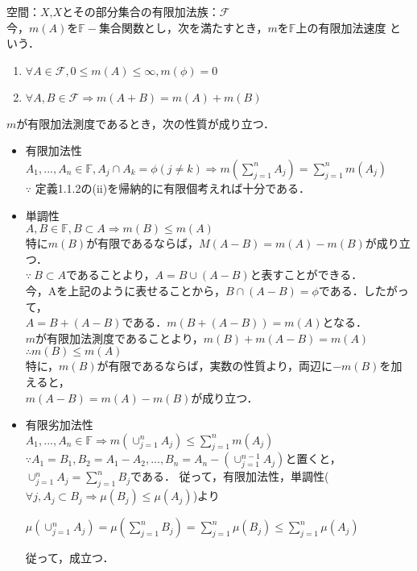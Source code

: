 \documentclass[11pt, a4paper, dvipdfmx]{jsarticle}
\theoremstyle{definition}
\newcommand{\F}{\mathcal{F}}
\begin{document}
\Definition 空間：$X$,$X$とその部分集合の有限加法族：$\F$\\
今，$m(A)$を$\mathbb{F}-$集合関数とし，次を満たすとき，$m$を$\mathbb{F}$上の有限加法速度
という．\\
\begin{enumerate}
\renewcommand{\labelenumi}{(\roman{enumi})}
\item $\forall A \in \F,0 \le m(A) \le \infty,m(\phi)=0$
\item $\forall A,B \in \F \Rightarrow m(A+B) = m(A)+m(B)$
\end{enumerate}
$m$が有限加法測度であるとき，次の性質が成り立つ．
\begin{itemize}
  \item 有限加法性\\
  $A_1,...,A_n \in \mathbb{F},A_j\cap A_k =\phi(j \neq k) \Rightarrow m(\sum_{j=1}^{n}A_j) = \sum_{j=1}^{n}m(A_j)$\\
  $\because$ 定義1.1.2の(ii)を帰納的に有限個考えれば十分である．\\
  \item 単調性\\
  $A,B \in \mathbb{F},B \subset A \Rightarrow m(B)\le m(A)$\\
  特に$m(B)$が有限であるならば，$M(A-B) = m(A)-m(B)$が成り立つ．\\
  $\because ~B \subset A$であることより，$A = B \cup (A-B)$と表すことができる．\\
  今，Aを上記のように表せることから，$B \cap (A-B) = \phi$である．したがって，\\
  $A = B + (A-B)$である．$m(B + (A - B) )= m(A)$となる．\\
  $m$が有限加法測度であることより，$m(B)+m(A-B) = m(A)$\\
  $\therefore m(B) \le m(A)$\\
  特に，$m(B)$が有限であるならば，実数の性質より，両辺に$-m(B)$を加えると，\\
  $m(A-B) = m(A) - m(B)$が成り立つ．

  \item 有限劣加法性\\
  $A_1,...,A_n \in \mathbb{F} \Rightarrow m(\cup_{j =1}^{n}A_j) \le \sum_{j=1}^{n}m(A_j)$\\
  $\because A_1 = B_1,B_2 = A_1 - A_2,...,B_n = A_n - (\cup_{j=1}^{n-1}A_j)$と置くと，
  $\cup_{j=1}^{n}A_j = \sum_{j=1}^{n}B_j$である．
  従って，有限加法性，単調性($\forall j ,A_j \subset B_j \Rightarrow \mu(B_j) \le \mu(A_j)$)より\\
  \begin{center}
    $\mu(\cup_{j=1}^{n}A_j) = \mu(\sum_{j=1}^{n}B_j) = \sum^{n}_{j=1}\mu(B_j) \le \sum^{n}_{j=1}\mu(A_j)$
  \end{center}
  従って，成立つ．\\

\end{itemize}
\end{document}
